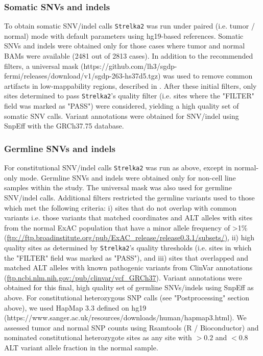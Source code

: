 \documentclass[phd,tocprelim]{cornell}
\begin{document}

\subsubsection*{Somatic SNVs and indels}

To obtain somatic SNV/indel calls \texttt{Strelka2} \cite{kim2018} was run under paired (i.e. tumor / normal) mode with default parameters using hg19-based references. Somatic SNVs and indels were obtained only for those cases where tumor and normal BAMs were available (2481 out of 2813 cases). In addition to the recommended filters, a universal mask (https://github.com/lh3/sgdp-fermi/releases/download/v1/sgdp-263-hs37d5.tgz) was used to remove common artifacts in low-mappability regions, described in \cite{mallick2016}.  After these initial filters, only sites determined to pass \texttt{Strelka2}'s quality filter (i.e. sites where the "FILTER" field was marked as "PASS") were considered, yielding a high quality set of somatic SNV calls. Variant annotations were obtained for SNV/indel using SnpEff with the GRCh37.75 database.

\subsubsection*{Germline SNVs and indels}

For constitutional SNV/indel calls \texttt{Strelka2} \cite{kim2018} was run as above, except in normal-only mode. Germline SNVs and indels were obtained only for non-cell line samples within the study. The universal mask was also used for germline SNV/indel calls. Additional filters restricted the germline variants used to those which met the following criteria: i) sites that do not overlap with common variants i.e. those variants that matched coordinates and ALT alleles with sites from the normal ExAC population that have a minor allele frequency of >1\% (\url{ftp://ftp.broadinstitute.org/pub/ExAC_release/release0.3.1/subsets/)}, ii) high quality sites as determined by \texttt{Strelka2}'s quality thresholds (i.e. sites in which the "FILTER" field was marked as "PASS"), and iii) sites that overlapped and matched ALT alleles with known pathogenic variants from ClinVar annotations (\url{ftp.ncbi.nlm.nih.gov:/pub/clinvar/vcf_GRCh37}). Variant annotations were obtained for this final, high quality set of germline SNVs/indels using SnpEff as above.  For constitutional heterozygous SNP calls (see "Postprocessing" section above), we used HapMap 3.3 defined on hg19 (https://www.sanger.ac.uk/resources/downloads/human/hapmap3.html).  We assessed tumor and normal SNP counts using Rsamtools (R / Bioconductor) and nominated constitutional heterozygote sites as any site with $>0.2$ and $<0.8$ ALT variant allele fraction in the normal sample.
\end{document}
